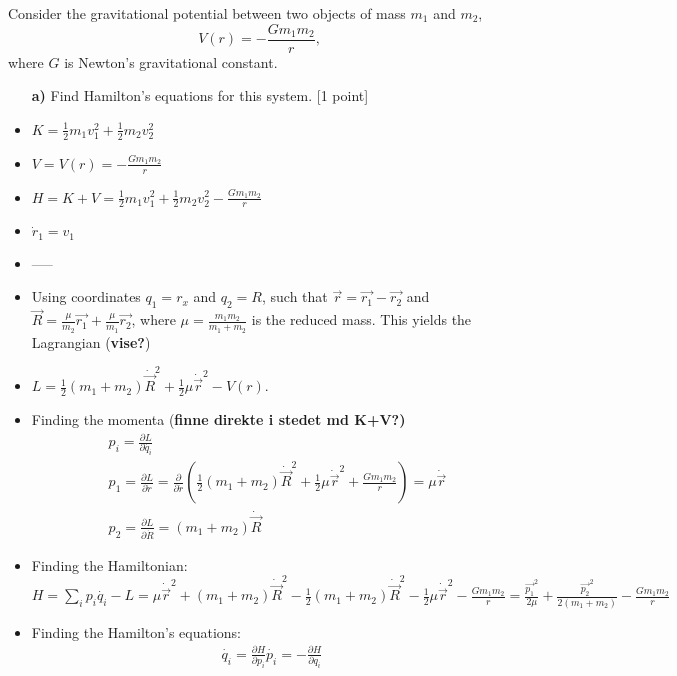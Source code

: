 \documentclass[11pt,a4paper]{report}
\newcounter{excount}[chapter]
\newenvironment{exercise}[1][]{\addtocounter{excount}{1} \noindent {\bf Question
    \arabic{excount} \ \ #1}\hspace{2mm}}{\vspace{4mm}}
\begin{document}
\begin{exercise}{\bf Orbital motion\\}
Consider the gravitational potential between two objects of mass $m_1$ and $m_2$,
\begin{equation}
V(r)=-\frac{Gm_1m_2}{r},\label{eq:grav_pot}
\end{equation}
where $G$ is Newton's gravitational constant.
\begin{itemize}
\item[{\bf a)}] Find Hamilton's equations for this system. [1 point]
\item $K=\frac{1}{2}m_1v_1^2+\frac{1}{2}m_2v_2^2$
\item $V=V(r)=-\frac{Gm_1m_2}{r}$
\item $H=K+V=\frac{1}{2}m_1v_1^2+\frac{1}{2}m_2v_2^2-\frac{Gm_1m_2}{r}$
\item $\dot{r}_1=v_1$

\item -----
\item Using coordinates $q_1=r_x$ and $q_2=R$, such that $\vec{r}=\vec{r_1}-\vec{r_2}$ and $\vec{R}=\frac{\mu}{m_2} \vec{r_1}+\frac{\mu}{m_1}\vec{r_2}$, where $\mu=\frac{m_1m_2}{m_1+m_2}$ is the reduced mass. This yields the Lagrangian (\textbf{vise?})
\item $L=\frac{1}{2}(m_1+m_2)\dot{\vec{R}}^2+\frac{1}{2}\mu\dot{\vec{r}}^2-V(r)$. 
\item Finding the momenta (\textbf{finne direkte i stedet md K+V?)}
\begin{align}
&p_i=\frac{\partial L}{\partial \dot{q_i}}\\
&p_1=\frac{\partial L}{\partial \dot{r}}=\frac{\partial }{\partial \dot{r}}  \left( \frac{1}{2}(m_1+m_2)\dot{\vec{R}}^2+\frac{1}{2}\mu\dot{\vec{r}}^2+\frac{Gm_1m_2}{r}\right)=\mu \dot{\vec{r}} \\
&p_2=\frac{\partial L}{\partial \dot{R}}=(m_1+m_2)\dot{\vec{R}}
\end{align} 
\item Finding the Hamiltonian: $H=\sum_ip_i\dot{q_i}-L=\mu \dot{\vec{r}}^2 +(m_1+m_2)\dot{\vec{R}}^2-\frac{1}{2}(m_1+m_2)\dot{\vec{R}}^2-\frac{1}{2}\mu\dot{\vec{r}}^2-\frac{Gm_1m_2}{r}=\frac{\vec{p_1}^2}{2\mu}+\frac{\vec{p_2}^2}{2(m_1+m_2)}-\frac{Gm_1m_2}{r}$
\item Finding the Hamilton's equations:
\begin{align*}
\dot{q_i}=\frac{\partial H}{\partial p_i}
\dot{p_i}=-\frac{\partial H}{\partial q_i}
\end{align*}


\end{itemize}
\end{exercise}
\end{document}
